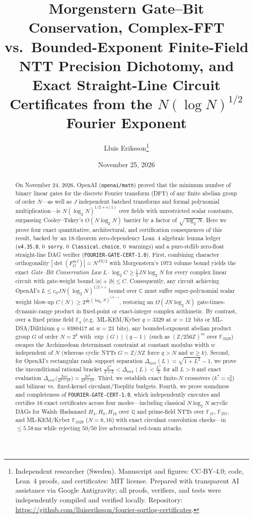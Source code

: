 \documentclass[11pt,a4paper]{article}
\title{\bfseries Morgenstern Gate--Bit Conservation, Complex-FFT vs.\ Bounded-Exponent Finite-Field NTT Precision Dichotomy, and Exact Straight-Line Circuit Certificates from the $N(\log N)^{1/2}$ Fourier Exponent}
\author{Lluis Eriksson\thanks{Independent researcher (Sweden). Manuscript and figures: CC-BY-4.0; code, Lean~4 proofs, and certificates: MIT license. Prepared with transparent AI assistance via Google Antigravity; all proofs, verifiers, and tests were independently compiled and verified locally. Repository: \url{https://github.com/lluiseriksson/fourier-sqrtlog-certificates}.}}
\date{November 25, 2026}
\theoremstyle{definition}
\theoremstyle{remark}
\newcommand{\QQ}{\mathbb{Q}}
\newcommand{\CC}{\mathbb{C}}
\newcommand{\ZZ}{\mathbb{Z}}
\newcommand{\FF}{\mathbb{F}}
\newcommand{\certschema}{\texttt{FOURIER-GATE-CERT-1.0}}
\begin{document}
\maketitle

\begin{abstract}
On November 24, 2026, OpenAI (\texttt{openai/math}) proved that the minimum number of binary linear gates for the discrete Fourier transform (DFT) of any finite abelian group of order $N$---as well as $J$ independent batched transforms and formal polynomial multiplication---is $N(\log_2 N)^{1/2+o(1)}$ over fields with unrestricted scalar constants, surpassing Cooley--Tukey's $O(N\log_2 N)$ barrier by a factor of $\sqrt{\log_2 N}$. Here we prove four exact quantitative, architectural, and certification consequences of this result, backed by an $18$-theorem zero-dependency Lean~4 algebraic lemma ledger (\texttt{v4.35.0}, $0$~\texttt{sorry}, $0$~\texttt{Classical.choice}, $0$~warnings) and a pure-stdlib zero-float straight-line DAG verifier (\certschema{}). First, combining character orthogonality $|\det(F_G^{\oplus J})| = N^{JN/2}$ with Morgenstern's $1973$ volume bound yields the exact \emph{Gate--Bit Conservation Law} $L \cdot \log_2 C \ge \frac{1}{2} J N \log_2 N$ for every complex linear circuit with gate-weight bound $|a|+|b| \le C$. Consequently, any circuit achieving OpenAI's $L \le c_0 J N (\log_2 N)^{1/2+\varepsilon}$ bound over $\CC$ must suffer super-polynomial scalar weight blow-up $C(N) \ge 2^{\frac{1}{2c_0}(\log_2 N)^{1/2-\varepsilon}}$, restoring an $\Omega(J N \log_2 N)$ gate-times-dynamic-range product in fixed-point or exact-integer complex arithmetic. By contrast, over a fixed prime field $\FF_q$ (e.g.\ ML-KEM/Kyber $q=3329$ at $w=12$~bits or ML-DSA/Dilithium $q=8380417$ at $w=23$~bits), any bounded-exponent abelian product group $G$ of order $N = 2^k$ with $\exp(G) \mid (q-1)$ (such as $(\ZZ/256\ZZ)^m$ over $\FF_{3329}$) escapes the Archimedean determinant constraint at constant modulus width $w$ independent of $N$ (whereas cyclic NTTs $G = \ZZ/N\ZZ$ force $q > N$ and $w \ge k$). Second, for OpenAI's rectangular rank--support separation $\Delta_{\mathrm{rect}}(L) = \sqrt{1+L^2}-1$, we prove the unconditional rational bracket $\frac{L^2}{2+L} < \Delta_{\mathrm{rect}}(L) < \frac{L^2}{2}$ for all $L > 0$ and exact evaluation $\Delta_{\mathrm{rect}}\bigl(\frac{2uv}{u^2-v^2}\bigr) = \frac{2v^2}{u^2-v^2}$. Third, we establish exact finite-$N$ crossovers ($k^* = c_0^2$) and bilinear vs.\ fixed-kernel circulant/Toeplitz budgets. Fourth, we prove soundness and completeness of \certschema{}, which independently executes and certifies $16$ exact certificates across four modes---including classical $N\log_2 N$ acyclic DAGs for Walsh--Hadamard $H_4, H_8, H_{16}$ over $\QQ$ and prime-field NTTs over $\FF_{17}$, $\FF_{257}$, and ML-KEM/Kyber $\FF_{3329}$ ($N=8,16$) with exact circulant convolution checks---in $\le 5.58\,\mathrm{ms}$ while rejecting $50/50$ live adversarial red-team attacks.
\end{abstract}
\end{document}
